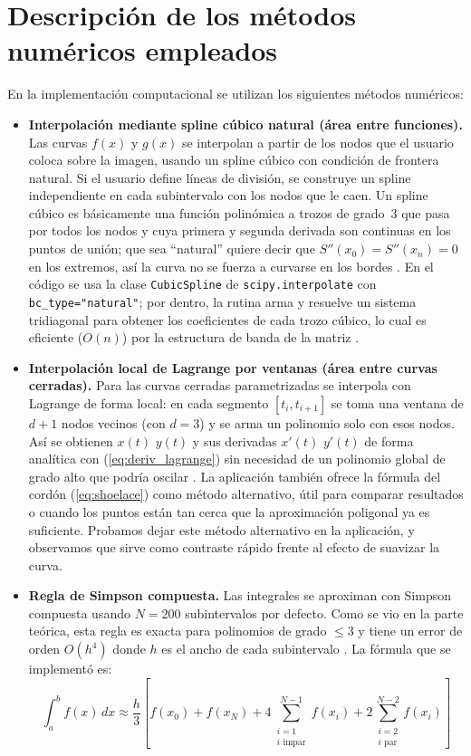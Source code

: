 \documentclass[12pt]{article}
\begin{document}
\section*{Descripción de los métodos numéricos empleados}

En la implementación computacional se utilizan los siguientes métodos numéricos:

\begin{itemize}
	\item \textbf{Interpolación mediante spline cúbico natural (área entre funciones).} Las curvas $f(x)$ y $g(x)$ se interpolan a partir de los nodos que el usuario coloca sobre la imagen, usando un spline cúbico con condición de frontera natural. Si el usuario define líneas de división, se construye un spline independiente en cada subintervalo con los nodos que le caen. Un spline cúbico es básicamente una función polinómica a trozos de grado~3 que pasa por todos los nodos y cuya primera y segunda derivada son continuas en los puntos de unión; que sea ``natural'' quiere decir que $S''(x_0) = S''(x_n) = 0$ en los extremos, así la curva no se fuerza a curvarse en los bordes \cite{burden02, cheney08}. En el código se usa la clase \texttt{CubicSpline} de \texttt{scipy.interpolate} \cite{scipy_cubicspline} con \texttt{bc\_type="natural"}; por dentro, la rutina arma y resuelve un sistema tridiagonal para obtener los coeficientes de cada trozo cúbico, lo cual es eficiente ($O(n)$) por la estructura de banda de la matriz \cite{burden02}.

	\item \textbf{Interpolación local de Lagrange por ventanas (área entre curvas cerradas).} Para las curvas cerradas parametrizadas se interpola con Lagrange de forma local: en cada segmento $[t_i, t_{i+1}]$ se toma una ventana de $d+1$ nodos vecinos (con $d=3$) y se arma un polinomio solo con esos nodos. Así se obtienen $x(t)$ $y(t)$ y sus derivadas $x'(t)$ $y'(t)$ de forma analítica con (\ref{eq:deriv_lagrange}) sin necesidad de un polinomio global de grado alto que podría oscilar \cite{cheney08}. La aplicación también ofrece la fórmula del cordón (\ref{eq:shoelace}) como método alternativo, útil para comparar resultados o cuando los puntos están tan cerca que la aproximación poligonal ya es suficiente. Probamos dejar este método alternativo en la aplicación, y observamos que sirve como contraste rápido frente al efecto de suavizar la curva.

	\item \textbf{Regla de Simpson compuesta.} Las integrales se aproximan con Simpson compuesta usando $N = 200$ subintervalos por defecto. Como se vio en la parte teórica, esta regla es exacta para polinomios de grado $\leq 3$ y tiene un error de orden $O(h^4)$ donde $h$ es el ancho de cada subintervalo \cite{mathworld_simpson, burden02}. La fórmula que se implementó es:
	\[
	\int_a^b f(x)\,dx \approx \frac{h}{3}\left[f(x_0) + f(x_N) + 4\sum_{\substack{i=1 \\ i\text{ impar}}}^{N-1} f(x_i) + 2\sum_{\substack{i=2 \\ i\text{ par}}}^{N-2} f(x_i)\right]
	\]
\end{itemize}




\end{document}
